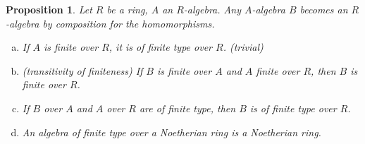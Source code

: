 \documentclass[DIV=14,parskip=half]{scrartcl}
\newtheorem{prop}{Proposition}[subsection]
\theoremstyle{definition}
\begin{document}
\begin{prop}\label{prop:1.4.1}
 Let $R$ be a ring, $A$ an $R$-algebra. Any $A$-algebra $B$ becomes an $R$-algebra by composition for the homomorphisms.
 \begin{enumerate}[a)]
  \item If $A$ is finite over $R$, it is of finite type over $R$. \checkmark (trivial)
  \item (transitivity of finiteness) If $B$ is finite over $A$ and $A$ finite over $R$, then $B$ is finite over $R$.
  \item If $B$ over $A$ and $A$ over $R$ are of finite type, then $B$ is of finite type over $R$.
  \item An algebra of finite type over a Noetherian ring is a Noetherian ring.
 \end{enumerate}

\end{prop}
\end{document}

